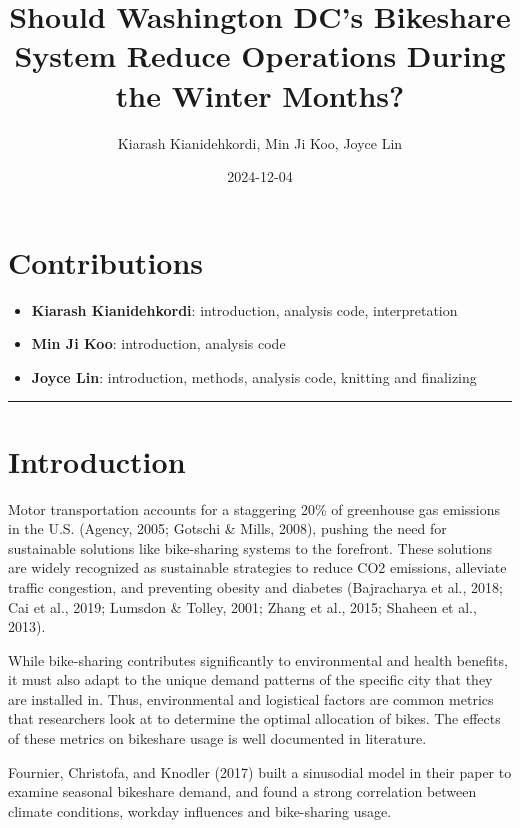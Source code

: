 \documentclass[
  10pt,
]{article}
\title{Should Washington DC's Bikeshare System Reduce Operations During
the Winter Months?}
\author{Kiarash Kianidehkordi, Min Ji Koo, Joyce Lin}
\date{2024-12-04}
\providecommand{\tightlist}{%
  \setlength{\itemsep}{0pt}\setlength{\parskip}{0pt}}
\begin{document}
\maketitle

\section{Contributions}\label{contributions}

\begin{itemize}
\tightlist
\item
  \textbf{Kiarash Kianidehkordi}: introduction, analysis code,
  interpretation
\item
  \textbf{Min Ji Koo}: introduction, analysis code
\item
  \textbf{Joyce Lin}: introduction, methods, analysis code, knitting and
  finalizing
\end{itemize}

\begin{center}\rule{0.5\linewidth}{0.5pt}\end{center}

\section{Introduction}\label{introduction}

Motor transportation accounts for a staggering 20\% of greenhouse gas
emissions in the U.S. (Agency, 2005; Gotschi \& Mills, 2008), pushing
the need for sustainable solutions like bike-sharing systems to the
forefront. These solutions are widely recognized as sustainable
strategies to reduce CO2 emissions, alleviate traffic congestion, and
preventing obesity and diabetes (Bajracharya et al., 2018; Cai et al.,
2019; Lumsdon \& Tolley, 2001; Zhang et al., 2015; Shaheen et al.,
2013).

While bike-sharing contributes significantly to environmental and health
benefits, it must also adapt to the unique demand patterns of the
specific city that they are installed in. Thus, environmental and
logistical factors are common metrics that researchers look at to
determine the optimal allocation of bikes. The effects of these metrics
on bikeshare usage is well documented in literature.

Fournier, Christofa, and Knodler (2017) built a sinusodial model in
their paper to examine seasonal bikeshare demand, and found a strong
correlation between climate conditions, workday influences and
bike-sharing usage.
\end{document}
